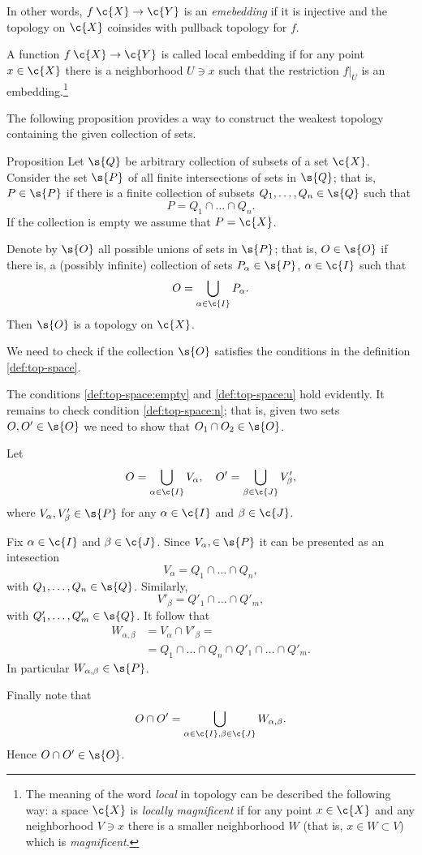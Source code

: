 In other words, $f\:\c{X}\to \c{Y}$ is an \emph{emebedding} if it is injective and the topology on $\c{X}$ coinsides with pullback topology for $f$.

A function $f\:\c{X}\to \c{Y}$ is called local embedding if for any point $x\in \c{X}$ there is a neighborhood $U\ni x$ such that the restriction $f|_U$ is an embedding.\footnote{The meaning of the word \emph{local} in topology can be described the following way: a space $\c{X}$ is \emph{locally magnificent} if for any point $x\in \c{X}$ and any neighborhood $V\ni x$ there is a smaller neighborhood $W$ (that is, $x\in W\subset V$) which is \emph{magnificent}.}
 
 
 
 
 
 
 
 
 
 
 
 
The following proposition provides a way to construct the weakest topology containing the given collection of sets.

\begin{thm}{Proposition}
Let $\s{Q}$ be arbitrary collection of subsets of a set $\c{X}$.
Consider the set $\s{P}$ of all finite intersections of sets in $\s{Q}$;
that is, $P\in \s{P}$ if there is a finite collection of subsets $Q_1,\dots,Q_n\in \s{Q}$ such that 
\[P=Q_1\cap\dots\cap Q_n.\]
If the collection is empty we assume that $P=\c{X}$.

Denote by $\s{O}$ all possible unions of sets in $\s{P}$;
that is, $O\in \s{O}$ if there is, a (possibly infinite) collection of sets $P_\alpha\in\s{P}$, $\alpha\in\c{I}$ such that 
\[O=\bigcup_{\alpha\in\c{I}}P_\alpha.\]
Then $\s{O}$ is a topology on $\c{X}$.
\end{thm}

We need to check if the collection $\s{O}$ satisfies the conditions in the definition \ref{def:top-space}.

The conditions \ref{def:top-space:empty} and \ref{def:top-space:u} hold evidently.
It remains to check condition \ref{def:top-space:n};
that is, given two sets $O,O'\in\s{O}$ we need to show that $O_1\cap O_2\in \s{O}$.

Let
\[O=\bigcup_{\alpha\in \c{I}}V_\alpha,\quad O'=\bigcup_{\beta\in \c{J}}V'_\beta,\]
where  $V_\alpha,V'_\beta\in\s{P}$ for any $\alpha\in\c{I}$ and $\beta\in\c{J}$.

Fix $\alpha\in\c{I}$ and $\beta\in\c{J}$.
Since $V_\alpha,\in\s{P}$ it can be presented as an intesection
\[V_\alpha=Q_1\cap \dots \cap Q_n,\]
with $Q_1,\dots,Q_n\in \s{Q}$.
Similarly, 
\[V'_\beta=Q'_1\cap \dots \cap Q'_m,\]
with $Q'_1,\dots,Q'_m\in \s{Q}$.
It follow that 
\begin{align*}
W_{\alpha,\beta}&=V_\alpha\cap V'_\beta=
\\
&=Q_1\cap \dots \cap Q_n\cap Q'_1\cap \dots \cap Q'_m.
\end{align*}
In particular $W_{\alpha,\beta}\in \s{P}$.

Finally note that
\[O\cap O'=\bigcup_{\alpha\in \c{I},\beta\in\c{J}}W_{\alpha,\beta}.\]
Hence $O\cap O'\in \s{O}$.
\qeds
